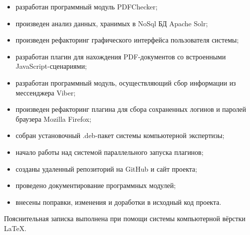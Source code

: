 \begin{itemize}
  \item разработан программный модуль PDFChecker;
  \item произведен анализ данных, хранимых в NoSql БД Apache Solr; 
  \item произведен рефакторинг графического интерфейса пользователя системы;
  \item разработан плагин для нахождения PDF-документов со встроенными JavaScript-сценариями;
  \item разработан программный модуль, осуществляющий сбор информации из мессенджера Viber;  
  \item произведен рефакторинг плагина для сбора сохраненных логинов и паролей браузера Mozilla Firefox;  
  \item собран установочный .deb-пакет системы компьютерной экспертизы;  
  \item начало работы над системой параллельного запуска плагинов; 
  \item созданы удаленный репозиторий на GitHub и сайт проекта;  
  \item проведено документирование программных модулей;
  \item внесены поправки, изменения и доработки в исходный код проекта.
\end{itemize}

Пояснительная записка выполнена при помощи системы компьютерной вёрстки \LaTeX.
